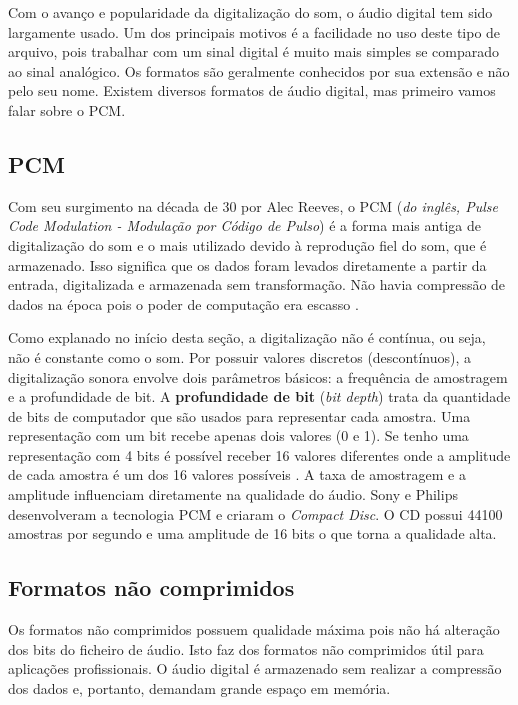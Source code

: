 Com o avanço e popularidade da digitalização do som, o áudio digital tem sido largamente usado. Um dos principais motivos é a facilidade no uso deste tipo de arquivo, pois trabalhar com um sinal digital é muito mais simples se comparado ao sinal analógico. Os formatos são geralmente conhecidos por sua extensão e não pelo seu nome. Existem diversos formatos de áudio digital, mas primeiro vamos falar sobre o PCM.

\subsection{PCM}

Com seu surgimento na década de 30 por Alec Reeves, o PCM (\textit{do inglês, Pulse Code Modulation - Modulação por Código de Pulso}) é a forma mais antiga de digitalização do som e o mais utilizado devido à reprodução fiel do som, que é armazenado. Isso significa que os dados foram levados diretamente a partir da entrada, digitalizada e armazenada sem transformação. Não havia compressão de dados na época pois o poder de computação era escasso \cite{pcm}.


Como explanado no início desta seção, a digitalização não é contínua, ou seja, não é constante como o som. Por possuir valores discretos (descontínuos), a digitalização sonora envolve dois parâmetros básicos: a frequência de amostragem e a profundidade de bit. A \textbf{profundidade de bit} (\textit{bit depth}) trata da quantidade de bits de computador que são usados para representar cada amostra. Uma representação com um bit recebe apenas dois valores (0 e 1). Se tenho uma representação com 4 bits é possível receber 16 valores diferentes onde a amplitude de cada amostra é um dos 16 valores possíveis \cite{pcm}. A taxa de amostragem e a amplitude influenciam diretamente na qualidade do áudio. Sony e Philips desenvolveram a tecnologia PCM e criaram o \textit{Compact Disc}. O CD possui 44100 amostras por segundo e uma amplitude de 16 bits o que torna a qualidade alta.

\subsection{Formatos não comprimidos}

Os formatos não comprimidos possuem qualidade máxima pois não há alteração dos bits do ficheiro de áudio. Isto faz dos formatos não comprimidos útil para aplicações profissionais. O áudio digital é armazenado sem realizar a compressão dos dados e, portanto, demandam grande espaço em memória.

